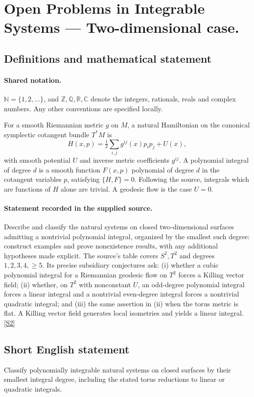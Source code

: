 \documentclass[11pt]{article}
\newcommand{\sref}[2]{\hyperlink{source:#1:#2}{[S#2]}}
\begin{document}
\section{Open Problems in Integrable Systems — Two-dimensional case.}\label{statement}

\subsection{Definitions and mathematical statement}

\paragraph{Shared notation.}$\mathbb N=\{1,2,\ldots\}$, and $\mathbb Z,\mathbb Q,\mathbb R,\mathbb C$ denote the integers, rationals, reals and complex numbers. Any other conventions are specified locally.


For a smooth Riemannian metric $g$ on $M$, a natural Hamiltonian on the canonical symplectic cotangent bundle $T^*M$ is \[H(x,p)=\tfrac12\sum_{i,j}g^{ij}(x)p_ip_j+U(x),\] with smooth potential $U$ and inverse metric coefficients $g^{ij}$. A polynomial integral of degree $d$ is a smooth function $F(x,p)$ polynomial of degree $d$ in the cotangent variables $p$, satisfying $\{H,F\}=0$. Following the source, integrals which are functions of $H$ alone are trivial. A geodesic flow is the case $U=0$.
\paragraph{Statement recorded in the supplied source.}
Describe and classify the natural systems on closed two-dimensional surfaces admitting a nontrivial polynomial integral, organized by the smallest such degree: construct examples and prove nonexistence results, with any additional hypotheses made explicit. The source's table covers $S^2,T^2$ and degrees $1,2,3,4,\ge5$. Its precise subsidiary conjectures ask: (i) whether a cubic polynomial integral for a Riemannian geodesic flow on $T^2$ forces a Killing vector field; (ii) whether, on $T^2$ with nonconstant $U$, an odd-degree polynomial integral forces a linear integral and a nontrivial even-degree integral forces a nontrivial quadratic integral; and (iii) the same assertion in (ii) when the torus metric is flat. A Killing vector field generates local isometries and yields a linear integral. \sref{statement}{2}
\subsection{Short English statement}
Classify polynomially integrable natural systems on closed surfaces by their smallest integral degree, including the stated torus reductions to linear or quadratic integrals.
\end{document}
